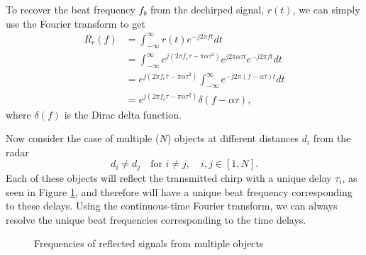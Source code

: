 To recover the beat frequency $f_b$ from the dechirped signal, $r(t)$, we can
simply use the Fourier transform to get
\begin{align}
	R_r(f) &= \int_{-\infty}^{\infty} r(t) e^{-j2 \pi ft} dt \label{eq:range-ft}\\
	&= \int_{-\infty}^{\infty} e^{j(2\pi f_c \tau - \pi \alpha \tau^2)}e^{j2\pi\alpha\tau t} e^{-j2\pi ft}dt\\
	&= e^{j(2\pi f_c \tau - \pi \alpha
	\tau^2)}\int_{-\infty}^{\infty}e^{-j2\pi(f - \alpha\tau ) t} dt\\
	&= e^{j(2\pi f_c \tau - \pi \alpha \tau^2)}\delta (f - \alpha \tau),
\end{align}
where $\delta(f)$ is the Dirac delta function.

Now consider the case of multiple ($N$) objects at different distances $d_i$ from the radar
\begin{equation}
	d_i \not = d_j \quad \text{for } i \not = j, \quad i,j \in [1, N].
\end{equation}
Each of these objects will reflect the transmitted chirp with a unique delay
$\tau_i$, as seen in Figure \ref{fig:multi-received}, and therefore will have a unique beat frequency corresponding to these
delays. Using the continuous-time Fourier transform, we can always resolve the
unique beat frequencies corresponding to the time delays. 

\begin{figure}[h]
	\centering
	\caption{Frequencies of reflected signals from multiple objects}
	\label{fig:multi-received}
\end{figure}

